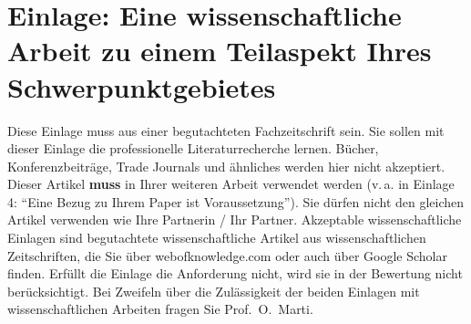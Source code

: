 
\section{Einlage: Eine wissenschaftliche Arbeit zu einem Teilaspekt Ihres Schwerpunktgebietes}
\label{sec:paper}

\begin{hinweise}
Diese Einlage muss aus einer begutachteten Fachzeitschrift sein. Sie sollen mit dieser Einlage die
professionelle Literaturrecherche lernen. Bücher, Konferenzbeiträge, Trade Journals und ähnliches werden hier
nicht akzeptiert.
Dieser Artikel \textbf{muss} in Ihrer weiteren Arbeit verwendet werden (v.\,a. in Einlage 4: \enquote{Eine
Bezug zu Ihrem Paper ist Voraussetzung}).
Sie dürfen nicht den gleichen Artikel verwenden wie Ihre Partnerin / Ihr Partner.
Akzeptable wissenschaftliche Einlagen sind begutachtete wissenschaftliche Artikel aus wissenschaftlichen
Zeitschriften, die Sie über webofknowledge.com oder auch über Google Scholar finden. Erfüllt die Einlage die
Anforderung nicht, wird sie in der Bewertung nicht berücksichtigt. Bei Zweifeln über die Zulässigkeit der
beiden Einlagen mit wissenschaftlichen Arbeiten fragen Sie Prof.~O.~Marti.
\end{hinweise}

